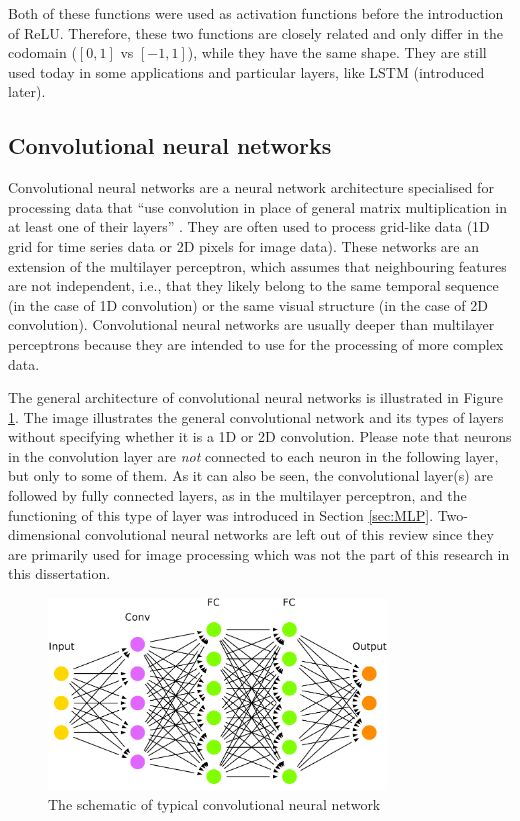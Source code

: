 Both of these functions were used as activation functions before the introduction of ReLU. Therefore, these two functions are closely related and only differ in the codomain ($[0, 1]$ vs $[-1, 1]$), while they have the same shape. They are still used today in some applications and particular layers, like LSTM (introduced later).



\subsection{Convolutional neural networks}

Convolutional neural networks are a neural network architecture specialised for processing data that ``use convolution in place of general matrix multiplication in at least one of their layers'' \cite{Goodfellow2016}. They are often used to process grid-like data (1D grid for time series data or 2D pixels for image data). These networks are an extension of the multilayer perceptron, which assumes that neighbouring features are not independent, i.e., that they likely belong to the same temporal sequence (in the case of 1D convolution) or the same visual structure (in the case of 2D convolution). Convolutional neural networks are usually deeper than multilayer perceptrons because they are intended to use for the processing of more complex data.

The general architecture of convolutional neural networks is illustrated in Figure \ref{fig:ConvArch}. The image illustrates the general convolutional network and its types of layers without specifying whether it is a 1D or 2D convolution. Please note that neurons in the convolution layer are \emph{not} connected to each neuron in the following layer, but only to some of them. As it can also be seen, the convolutional layer(s) are followed by fully connected layers, as in the multilayer perceptron, and the functioning of this type of layer was introduced in Section \ref{sec:MLP}. Two-dimensional convolutional neural networks are left out of this review since they are primarily used for image processing which was not the part of this research in this dissertation.

\begin{figure}
    \centering
    \includegraphics[width=0.8\textwidth]{slike/arch_conv.pdf}
    \caption{The schematic of typical convolutional neural network}
    \label{fig:ConvArch}
\end{figure}

